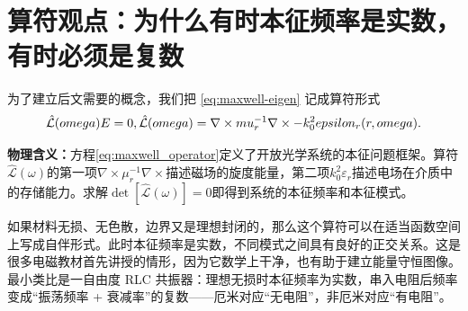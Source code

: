 \section{算符观点：为什么有时本征频率是实数，有时必须是复数}
为了建立后文需要的概念，我们把 \cref{eq:maxwell-eigen} 记成算符形式
\begin{equation}
\hat{\mathcal L}(\omega)\E = 0,
\qquad
\hat{\mathcal L}(\omega)=\nabla\times\mu_r^{-1}\nabla\times-k_0^2\varepsilon_r(\rvec,\omega).
\label{eq:maxwell_operator}
\end{equation}

\textbf{物理含义：}方程\cref{eq:maxwell_operator}定义了开放光学系统的本征问题框架。算符$\hat{\mathcal L}(\omega)$的第一项$\nabla\times\mu_r^{-1}\nabla\times$描述磁场的旋度能量，第二项$k_0^2\varepsilon_r$描述电场在介质中的存储能力。求解$\det[\hat{\mathcal L}(\omega)]=0$即得到系统的本征频率和本征模式。

如果材料无损、无色散，边界又是理想封闭的，那么这个算符可以在适当函数空间上写成自伴形式。此时本征频率是实数，不同模式之间具有良好的正交关系。这是很多电磁教材首先讲授的情形，因为它数学上干净，也有助于建立能量守恒图像。最小类比是一自由度 RLC 共振器：理想无损时本征频率为实数，串入电阻后频率变成“振荡频率 + 衰减率”的复数——厄米对应“无电阻”，非厄米对应“有电阻”。

